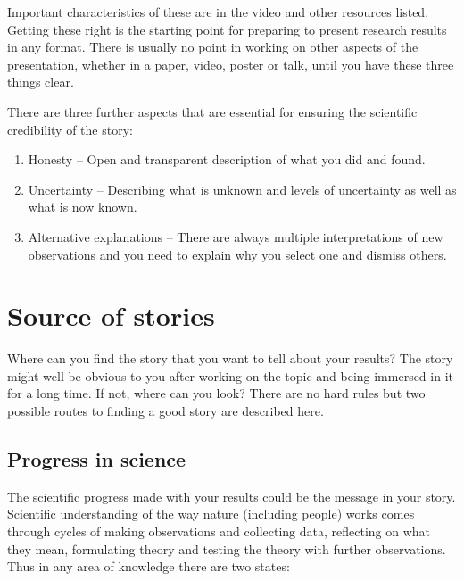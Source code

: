 \documentclass[
]{book}
\begin{document}
Important characteristics of these are in the video and other resources listed. Getting these right is the starting point for preparing to present research results in any format. There is usually no point in working on other aspects of the presentation, whether in a paper, video, poster or talk, until you have these three things clear.

There are three further aspects that are essential for ensuring the scientific credibility of the story:

\begin{enumerate}
\def\labelenumi{\arabic{enumi}.}
\setcounter{enumi}{3}
\item
  Honesty -- Open and transparent description of what you did and found.
\item
  Uncertainty -- Describing what is unknown and levels of uncertainty as well as what is now known.
\item
  Alternative explanations -- There are always multiple interpretations of new observations and you need to explain why you select one and dismiss others.
\end{enumerate}

\hypertarget{source-of-stories}{%
\section{Source of stories}\label{source-of-stories}}

Where can you find the story that you want to tell about your results? The story might well be obvious to you after working on the topic and being immersed in it for a long time. If not, where can you look? There are no hard rules but two possible routes to finding a good story are described here.

\hypertarget{progress-in-science}{%
\subsection{Progress in science}\label{progress-in-science}}

The scientific progress made with your results could be the message in your story. Scientific understanding of the way nature (including people) works comes through cycles of making observations and collecting data, reflecting on what they mean, formulating theory and testing the theory with further observations. Thus in any area of knowledge there are two states:
\end{document}
